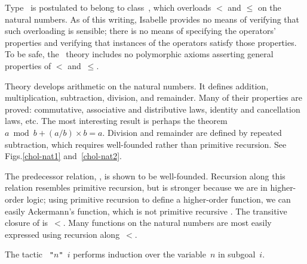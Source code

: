 Type~ is postulated to belong to class~, which
overloads $<$ and $\leq$ on the natural numbers.  As of this writing,
Isabelle provides no means of verifying that such overloading is sensible;
there is no means of specifying the operators' properties and verifying
that instances of the operators satisfy those properties.  To be safe, the
\CHOL\ theory includes no polymorphic axioms asserting general properties of
$<$ and~$\leq$.

Theory  develops arithmetic on the natural numbers.  It
defines addition, multiplication, subtraction, division, and remainder.
Many of their properties are proved: commutative, associative and
distributive laws, identity and cancellation laws, etc.  The most
interesting result is perhaps the theorem $a \bmod b + (a/b)\times b = a$.
Division and remainder are defined by repeated subtraction, which requires
well-founded rather than primitive recursion.  See Figs.\ts\ref{chol-nat1}
and~\ref{chol-nat2}.

The predecessor relation, , is shown to be well-founded.
Recursion along this relation resembles primitive recursion, but is
stronger because we are in higher-order logic; using primitive recursion to
define a higher-order function, we can easily Ackermann's function, which
is not primitive recursive \cite[page~104]{thompson91}.
The transitive closure of  is~$<$.  Many functions on the
natural numbers are most easily expressed using recursion along~$<$.

The tactic {\tt{} "$n$" $i$} performs induction over the
variable~$n$ in subgoal~$i$.

